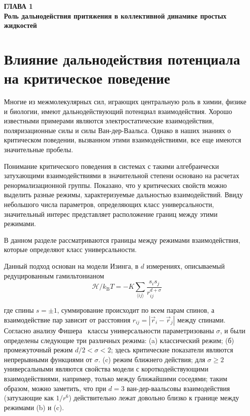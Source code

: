 \newpage
\begin{center}
\textbf{\large ГЛАВА 1 \\ Роль дальнодействия притяжения в коллективной динамике простых жидкостей}
\end{center}



\section{Влияние дальнодействия потенциала на критическое поведение}

Многие из межмолекулярных сил, играющих центральную роль в химии, физике и биологии, имеют дальнодействующий потенциал взаимодействия.
Хорошо известными примерами являются электростатические взаимодействия, поляризационные силы и силы Ван-дер-Ваальса.
Однако в наших знаниях о критическом поведении, вызванном этими взаимодействиями, все еще имеются значительные пробелы.

Понимание критического поведения в системах с такими алгебраически затухающими взаимодействиями в значительной степени основано на расчетах ренормализационной группы.
Показано, что у критических свойств можно выделить разные режимы, характеризуемые дальностью взаимодействий.
Ввиду небольшого числа параметров, определяющих класс универсальности, значительный интерес представляет расположение границ между этими режимами.

В данном разделе рассматриваются границы между режимами взаимодействия, которые определяют класс универсальности. 

Данный подход основан на модели Изинга, в $d$ измерениях, описываемый редуцированным гамильтонианом
\begin{equation}
\mathcal{H} / k_{\mathrm{B}} T=-K \sum_{\langle i j\rangle} \frac{s_{i} s_{j}}{r_{i j}^{d+\sigma}}
\label{eq1}
\end{equation}

где спины $s=\pm 1$, суммирование происходит по всем парам спинов, а взаимодействие пар зависит от расстояния $r_{i j}=\left|\vec {r}_{i}-\vec{r}_{j}\right|$ между спинами. Согласно анализу Фишера~\cite{10.1103/PhysRevLett.29.917} классы универсальности параметризованы $\sigma$, и были определены следующие три различных режима: (a) классический режим; (б) промежуточный режим $d/2<\sigma<2$; здесь критические показатели являются непрерывными функциями от $\sigma$. (c) режим ближнего действия; для $\sigma\geq 2$ универсальными являются свойства модели с короткодействующими взаимодействиями, например, только между ближайшими соседями; таким образом, можно заметить, что при $d=3$ ван-дер-ваальсовы взаимодействия (затухающие как $1/r^{6}$) действительно лежат довольно близко к границе между режимами (b) и (c).

